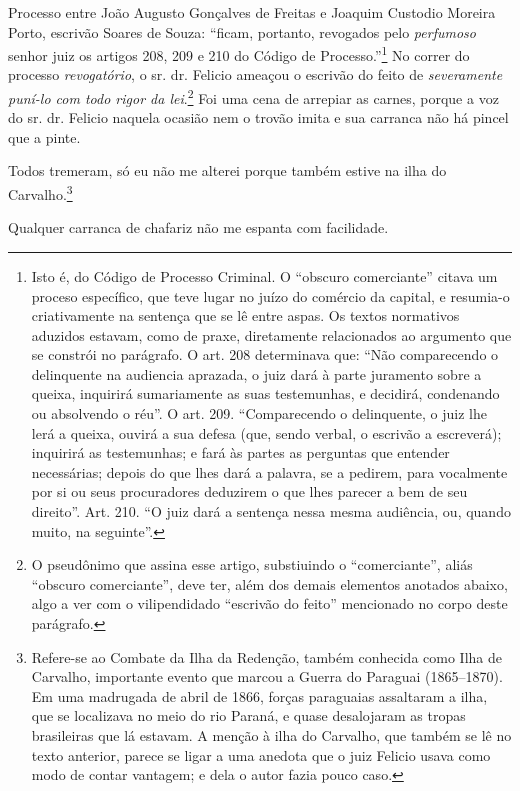 Processo entre João Augusto Gonçalves de Freitas e Joaquim Custodio
Moreira Porto, escrivão Soares de Souza: ``ficam, portanto, revogados
pelo \emph{perfumoso} senhor juiz os artigos 208, 209 e 210 do Código de
Processo.''\footnote{ Isto é, do Código de Processo Criminal. O ``obscuro
  comerciante'' citava um proceso específico, que teve lugar no juízo do
  comércio da capital, e resumia-o criativamente na sentença que se lê
  entre aspas. Os textos normativos aduzidos estavam, como de praxe,
  diretamente relacionados ao argumento que se constrói no parágrafo. O
  art. 208 determinava que: ``Não comparecendo o delinquente na audiencia
  aprazada, o juiz dará à parte juramento sobre a queixa, inquirirá
  sumariamente as suas testemunhas, e decidirá, condenando ou absolvendo
  o réu''. O art. 209. ``Comparecendo o delinquente, o juiz lhe lerá a
  queixa, ouvirá a sua defesa (que, sendo verbal, o escrivão a
  escreverá); inquirirá as testemunhas; e fará às partes as perguntas
  que entender necessárias; depois do que lhes dará a palavra, se a
  pedirem, para vocalmente por si ou seus procuradores deduzirem o que
  lhes parecer a bem de seu direito''. Art. 210. ``O juiz dará a sentença
  nessa mesma audiência, ou, quando muito, na seguinte''.} No correr do
processo \emph{revogatório}, o sr. dr. Felicio ameaçou o escrivão do
feito de \emph{severamente puní-lo com todo rigor da lei}.\footnote{ O
  pseudônimo que assina esse artigo, substiuindo o ``comerciante'', aliás
  ``obscuro comerciante'', deve ter, além dos demais elementos anotados
  abaixo, algo a ver com o vilipendidado ``escrivão do feito'' mencionado
  no corpo deste parágrafo.} Foi uma cena de arrepiar as carnes, porque
a voz do sr. dr. Felicio naquela ocasião nem o trovão imita e sua
carranca não há pincel que a pinte.

Todos tremeram, só eu não me alterei porque também estive na ilha do
Carvalho.\footnote{ Refere-se ao Combate da Ilha da Redenção, também
  conhecida como Ilha de Carvalho, importante evento que marcou a Guerra
  do Paraguai (1865--1870). Em uma madrugada de abril de 1866, forças
  paraguaias assaltaram a ilha, que se localizava no meio do rio Paraná,
  e quase desalojaram as tropas brasileiras que lá estavam. A menção à
  ilha do Carvalho, que também se lê no texto anterior, parece se ligar
  a uma anedota que o juiz Felicio usava como modo de contar vantagem; e
  dela o autor fazia pouco caso.}


Qualquer carranca de chafariz não me espanta com facilidade.

\asterisc{}

